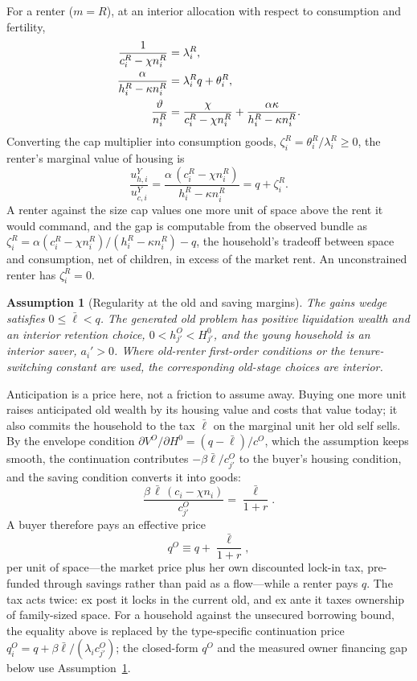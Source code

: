 \documentclass[11pt]{article}
\newtheorem{assumption}{Assumption}
\newcommand{\1}{\mathbf 1}
\begin{document}
For a renter ($m=R$), at an interior allocation with respect to consumption and fertility,
\begin{align}
\frac{1}{c_i^R-\chi n_i^R}&=\lambda_i^R,
\notag\\
\frac{\alpha}{h_i^R-\kappa n_i^R}&=\lambda_i^R q+\theta_i^R,
\notag\\
\frac{\vartheta}{n_i^R}&=\frac{\chi}{c_i^R-\chi n_i^R}+\frac{\alpha\kappa}{h_i^R-\kappa n_i^R}.
\label{eq:compact_renter_foc_n}
\end{align}
Converting the cap multiplier into consumption goods, $\zeta_i^R=\theta_i^R/\lambda_i^R\ge0$, the renter's marginal value of housing is
\begin{equation}
\frac{u^Y_{h,i}}{u^Y_{c,i}}
=
\frac{\alpha\,(c_i^R-\chi n_i^R)}{h_i^R-\kappa n_i^R}
=
q+\zeta_i^R.
\label{eq:compact_renter_mv}
\end{equation}
A renter against the size cap values one more unit of space above the rent it would command, and the gap is computable from the observed bundle as $\zeta_i^R=\alpha(c_i^R-\chi n_i^R)/(h_i^R-\kappa n_i^R)-q$, the household's tradeoff between space and consumption, net of children, in excess of the market rent. An unconstrained renter has $\zeta_i^R=0$.

\begin{assumption}[Regularity at the old and saving margins]
\label{ass:carry_neutral}
The gains wedge satisfies $0\le\bar\ell<q$. The generated old problem has positive liquidation wealth and an interior retention choice, $0<h_{j'}^O<H_{j'}^0$, and the young household is an interior saver, $a_i'>0$. Where old-renter first-order conditions or the tenure-switching constant are used, the corresponding old-stage choices are interior.
\end{assumption}

Anticipation is a price here, not a friction to assume away. Buying one more unit raises anticipated old wealth by its housing value and costs that value today; it also commits the household to the tax $\bar\ell$ on the marginal unit her old self sells. By the envelope condition $\partial V^O/\partial H^0=(q-\bar\ell)/c^O$, which the assumption keeps smooth, the continuation contributes $-\beta\bar\ell/c_{j'}^O$ to the buyer's housing condition, and the saving condition converts it into goods:
\[
\frac{\beta\,\bar\ell\,(c_i-\chi n_i)}{c_{j'}^O}=\frac{\bar\ell}{1+r}.
\]
A buyer therefore pays an effective price
\[
q^O\equiv q+\frac{\bar\ell}{1+r},
\]
per unit of space---the market price plus her own discounted lock-in tax, pre-funded through savings rather than paid as a flow---while a renter pays $q$. The tax acts twice: ex post it locks in the current old, and ex ante it taxes ownership of family-sized space.
For a household against the unsecured borrowing bound, the equality above is replaced by the type-specific continuation price $q_i^O=q+\beta\bar\ell/(\lambda_i c_{j'}^O)$; the closed-form $q^O$ and the measured owner financing gap below use Assumption~\ref{ass:carry_neutral}.
\end{document}

